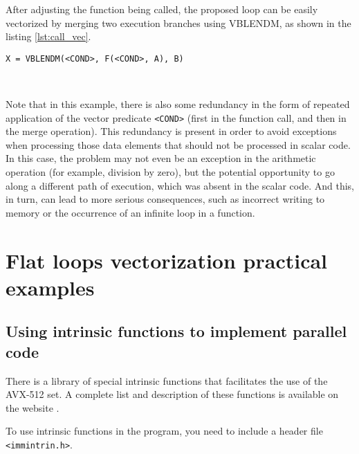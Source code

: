 \documentclass[
11pt,%
tightenlines,%
twoside,%
onecolumn,%
nofloats,%
nobibnotes,%
nofootinbib,%
superscriptaddress,%
noshowpacs,%
centertags]%
{revtex4}
\begin{document}
After adjusting the function being called, the proposed loop can be easily vectorized by merging two execution branches using VBLENDM, as shown in the listing \ref{lst:call_vec}.

\begin{lstlisting}[caption={Vectorization of a flat loop with a function call under the condition},label={lst:call_vec}]
X = VBLENDM(<COND>, F(<COND>, A), B)

\end{lstlisting}

\

Note that in this example, there is also some redundancy in the form of repeated application of the vector predicate \texttt{<COND>} (first in the function call, and then in the merge operation).
This redundancy is present in order to avoid exceptions when processing those data elements that should not be processed in scalar code.
In this case, the problem may not even be an exception in the arithmetic operation (for example, division by zero), but the potential opportunity to go along a different path of execution, which was absent in the scalar code.
And this, in turn, can lead to more serious consequences, such as incorrect writing to memory or the occurrence of an infinite loop in a function.

\section{Flat loops vectorization practical examples}

\subsection{Using intrinsic functions to implement parallel code}

There is a library of special intrinsic functions that facilitates the use of the AVX-512 set. A complete list and description of these functions is available on the website \cite{Intel_Intr}.

To use intrinsic functions in the program, you need to include a header file \texttt{<immintrin.h>}.
\end{document}
